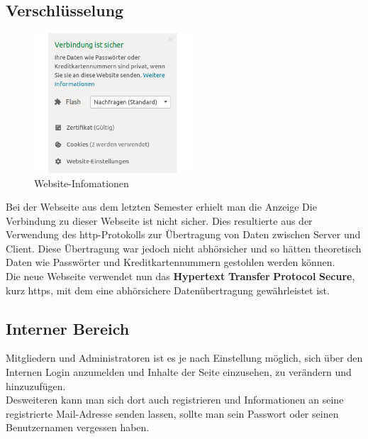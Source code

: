 \documentclass[12pt,a4paper]{article}
\begin{document}
\subsection{Verschlüsselung}
\begin{figure}
  \includegraphics[width=6.0cm]{https.png}
  \caption{Website-Infomationen}
  \label{img:https}
\end{figure}
Bei der  Webseite aus dem letzten Semester erhielt man die Anzeige \glqq Die Verbindung zu dieser Webseite ist nicht sicher\grqq. Dies resultierte aus der Verwendung des http-Protokolls zur Übertragung von Daten zwischen Server und Client. Diese Übertragung war jedoch nicht abhörsicher und so hätten theoretisch Daten wie Passwörter und Kreditkartennummern gestohlen werden können.\\
Die neue Webseite verwendet nun das \textbf{Hypertext} \textbf{Transfer} \textbf{Protocol} \textbf{Secure}, kurz https, mit dem eine abhörsichere Datenübertragung gewährleistet ist.

\subsection{Interner Bereich}
Mitgliedern und Administratoren ist es je nach Einstellung möglich, sich über den Internen Login anzumelden und Inhalte der Seite  einzusehen, zu verändern und hinzuzufügen.\\
Desweiteren kann man sich dort auch registrieren und Informationen an seine registrierte Mail-Adresse senden lassen, sollte man sein Passwort oder seinen Benutzernamen vergessen haben. 
\end{document}
